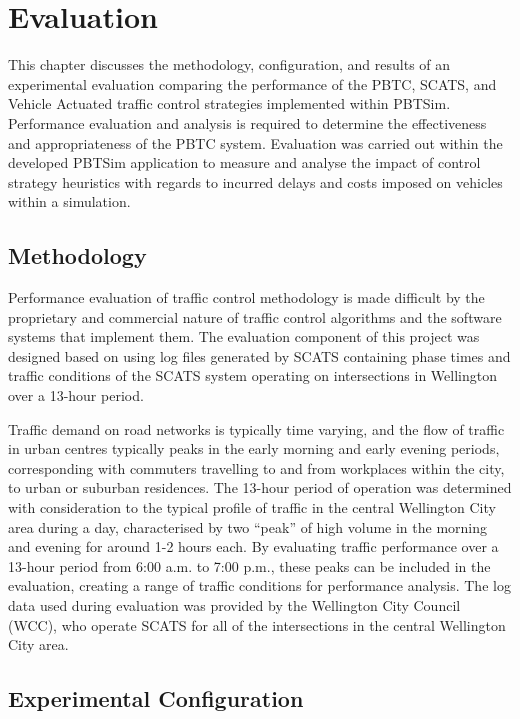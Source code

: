 \chapter{Evaluation}
\label{chapter:evaluation}

This chapter discusses the methodology, configuration, and results of an experimental evaluation comparing the performance of the PBTC, SCATS, and Vehicle Actuated traffic control strategies implemented within PBTSim. Performance evaluation and analysis is required to determine the effectiveness and appropriateness of the PBTC system. Evaluation was carried out within the developed PBTSim application to measure and analyse the impact of control strategy heuristics with regards to incurred delays and costs imposed on vehicles within a simulation.

\section{Methodology}

Performance evaluation of traffic control methodology is made difficult by the proprietary and commercial nature of traffic control algorithms and the software systems that implement them. The evaluation component of this project was designed based on using log files generated by SCATS containing phase times and traffic conditions of the SCATS system operating on intersections in Wellington over a 13-hour period. 

Traffic demand on road networks is typically time varying, and the flow of traffic in urban centres typically peaks in the early morning and early evening periods, corresponding with commuters travelling to and from workplaces within the city, to urban or suburban residences. The 13-hour period of operation was determined with consideration to the typical profile of traffic in the central Wellington City area during a day, characterised by two ``peak'' of high volume in the morning and evening for around 1-2 hours each. By evaluating traffic performance over a 13-hour period from 6:00 a.m. to 7:00 p.m., these peaks can be included in the evaluation, creating a range of traffic conditions for performance analysis. The log data used during evaluation was provided by the Wellington City Council (WCC), who operate SCATS for all of the intersections in the central Wellington City area. 

\section{Experimental Configuration}

